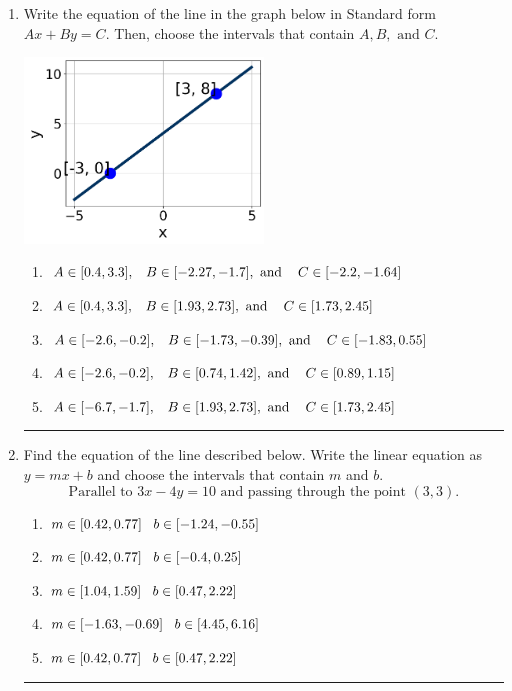 \documentclass[14pt]{extbook}
\newcommand{\litem}[1]{\item#1\hspace*{-1cm}\rule{\textwidth}{0.4pt}}
\begin{document}
\begin{enumerate}
{\begin{enumerate}[label=\Alph*.]
\end{enumerate} }
\litem{
Write the equation of the line in the graph below in Standard form $Ax+By=C$. Then, choose the intervals that contain $A, B, \text{ and } C$.
\begin{center}
    \includegraphics[width=0.5\textwidth]{../Figures/linearGraphToStandardA.png}
\end{center}
\begin{enumerate}[label=\Alph*.]
\item \( A \in [0.4, 3.3], \hspace{3mm} B \in [-2.27, -1.7], \text{ and } \hspace{3mm} C \in [-2.2, -1.64] \)
\item \( A \in [0.4, 3.3], \hspace{3mm} B \in [1.93, 2.73], \text{ and } \hspace{3mm} C \in [1.73, 2.45] \)
\item \( A \in [-2.6, -0.2], \hspace{3mm} B \in [-1.73, -0.39], \text{ and } \hspace{3mm} C \in [-1.83, 0.55] \)
\item \( A \in [-2.6, -0.2], \hspace{3mm} B \in [0.74, 1.42], \text{ and } \hspace{3mm} C \in [0.89, 1.15] \)
\item \( A \in [-6.7, -1.7], \hspace{3mm} B \in [1.93, 2.73], \text{ and } \hspace{3mm} C \in [1.73, 2.45] \)

\end{enumerate} }
\litem{
Find the equation of the line described below. Write the linear equation as $ y=mx+b $ and choose the intervals that contain $m$ and $b$.\[ \text{Parallel to } 3 x - 4 y = 10 \text{ and passing through the point } (3, 3). \]\begin{enumerate}[label=\Alph*.]
\item \( m \in [0.42, 0.77] \hspace*{3mm} b \in [-1.24, -0.55] \)
\item \( m \in [0.42, 0.77] \hspace*{3mm} b \in [-0.4, 0.25] \)
\item \( m \in [1.04, 1.59] \hspace*{3mm} b \in [0.47, 2.22] \)
\item \( m \in [-1.63, -0.69] \hspace*{3mm} b \in [4.45, 6.16] \)
\item \( m \in [0.42, 0.77] \hspace*{3mm} b \in [0.47, 2.22] \)


\end{enumerate}}
\end{enumerate}
\end{document}
